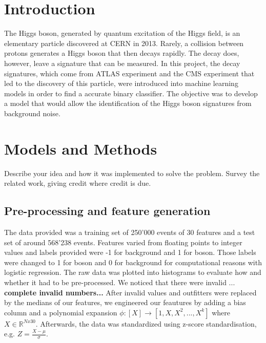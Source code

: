 \documentclass[10pt,conference,compsocconf]{IEEEtran}
\begin{document}
\section{Introduction}\label{sec: introduction}
    The Higgs boson, generated by quantum excitation of the Higgs field, is an elementary particle discovered at CERN in 2013. Rarely, a collision between protons generates a Higgs boson that then decays rapidly. The decay does, however, leave a signature that can be measured. In this project, the decay signatures, which come from ATLAS experiment and the CMS experiment that led to the discovery of this particle, were introduced into machine learning models in order to find a accurate binary classifier. The objective was to develop a model that would allow the identification of the Higgs boson signatures from background noise.
\section{Models and Methods}\label{sec: models_methods}
    Describe your idea and how it was implemented to solve
    the problem. Survey the related work, giving credit where credit is
    due.
    \subsection{Pre-processing and feature generation}\label{subsec:pre-processing}
    The data provided was a training set of 250'000 events of 30 features and a test set of around 568'238 events. Features varied from floating points to integer values and labels provided were -1 for background and 1 for boson. Those labels were changed to 1 for boson and 0 for background for computational reasons with logistic regression.  The raw data was plotted into histograms to evaluate how and whether it had to be pre-processed. We noticed that there were invalid ...
    \textbf{complete invalid numbers...}
    After invalid values and outfitters were replaced by the medians of our features, we engineered our feautures by adding a bias column and a polynomial expansion $\phi: [X] \rightarrow [1, X, X^2, ...,X^k]$ where $X\in \mathbb{R}^{Nx30}$. Afterwards, the data was standardized using z-score standardisation, e.g. $Z = \frac{X - \mu}{\sigma}$. 
\end{document}
